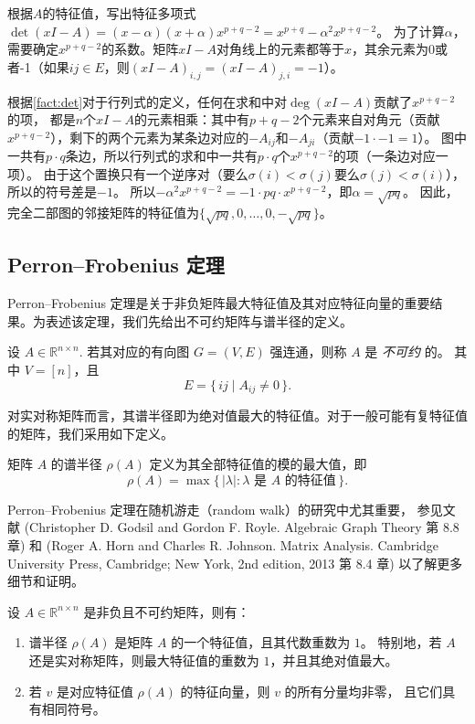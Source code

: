 \documentclass[lang=cn,newtx,10pt,scheme=chinese,chinesefont=nofont,citestyle=gb7714-2015, bibstyle=gb7714-2015]{elegantbook}
\begin{document}
\begin{refsection}
根据$A$的特征值，写出特征多项式$\det(xI-A)=(x-\alpha)(x+\alpha)x^{p+q-2}=x^{p+q}-\alpha^2x^{p+q-2}$。
为了计算$\alpha$，需要确定$x^{p+q-2}$的系数。矩阵$xI-A$对角线上的元素都等于$x$，其余元素为0或者-1（如果$ij\in E$，则$(xI-A)_{i,j}=(xI-A)_{j,i}=-1$）。

根据\cref{fact:det}对于行列式的定义，任何在求和中对$\deg(xI-A)$贡献了$x^{p+q-2}$的项，
都是$n$个$xI-A$的元素相乘：其中有$p+q-2$个元素来自对角元（贡献$x^{p+q-2}$），剩下的两个元素为某条边对应的$-A_{ij}$和$-A_{ji}$（贡献$-1\cdot -1=1$）。
图中一共有$p\cdot q$条边，所以行列式的求和中一共有$p\cdot q$个$x^{p+q-2}$的项（一条边对应一项）。
由于这个置换只有一个逆序对（要么$\sigma(i)<\sigma(j)$要么$\sigma(j)<\sigma(i)$），所以的符号差是$-1$。
所以$-\alpha^2x^{p+q-2}=-1\cdot pq\cdot x^{p+q-2}$，即$\alpha=\sqrt{pq}$。
因此，完全二部图的邻接矩阵的特征值为$\{\sqrt{pq},0,\dots,0,-\sqrt{pq}\}$。

\subsection{Perron--Frobenius 定理}

Perron--Frobenius 定理是关于非负矩阵最大特征值及其对应特征向量的重要结果。为表述该定理，我们先给出不可约矩阵与谱半径的定义。

\begin{definition}[不可约矩阵]\label{def:irreducible}
设 $A\in \mathbb{R}^{n\times n}$. 若其对应的有向图 $G=(V,E)$ 强连通，则称 $A$ 是 \emph{不可约} 的。
其中 $V=[n]$，且
\[
E=\{\, ij \mid A_{ij}\neq 0 \,\}.
\]
\end{definition}

对实对称矩阵而言，其谱半径即为绝对值最大的特征值。对于一般可能有复特征值的矩阵，我们采用如下定义。

\begin{definition}[谱半径]\label{def:spectral-radius}
矩阵 $A$ 的谱半径 $\rho(A)$ 定义为其全部特征值的模的最大值，即
\[
\rho(A)=\max\{\, |\lambda| : \lambda \text{ 是 } A \text{ 的特征值} \,\}.
\]
\end{definition}

Perron--Frobenius 定理在随机游走（random walk）的研究中尤其重要，
参见文献 (Christopher D. Godsil and Gordon F. Royle. Algebraic Graph Theory 第 8.8 章) 和 (Roger A. Horn and Charles R. Johnson. Matrix Analysis. Cambridge University Press, Cambridge;
New York, 2nd edition, 2013 第 8.4 章) 以了解更多细节和证明。

\begin{theorem}\label{thm:PF}
设 $A\in \mathbb{R}^{n\times n}$ 是非负且不可约矩阵，则有：
\begin{enumerate}
    \item 谱半径 $\rho(A)$ 是矩阵 $A$ 的一个特征值，且其代数重数为 $1$。
    特别地，若 $A$ 还是实对称矩阵，则最大特征值的重数为 $1$，并且其绝对值最大。
    \item 若 $v$ 是对应特征值 $\rho(A)$ 的特征向量，则 $v$ 的所有分量均非零，
    且它们具有相同符号。
\end{enumerate}
\end{theorem}




\end{refsection}
\end{document}
